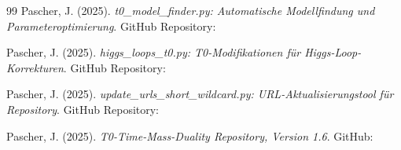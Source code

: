 \begin{thebibliography}{99}
			Pascher, J. (2025). \textit{t0\_model\_finder.py: Automatische Modellfindung und Parameteroptimierung}.
			GitHub Repository: 
			
			Pascher, J. (2025). \textit{higgs\_loops\_t0.py: T0-Modifikationen für Higgs-Loop-Korrekturen}.
			GitHub Repository: 
			
			Pascher, J. (2025). \textit{update\_urls\_short\_wildcard.py: URL-Aktualisierungstool für Repository}.
			GitHub Repository: 
			
			Pascher, J. (2025). \textit{T0-Time-Mass-Duality Repository, Version 1.6}.
			GitHub: 

	\end{thebibliography}
	
